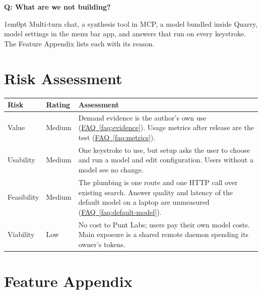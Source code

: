 \documentclass[11pt,letterpaper]{article}
\newcounter{faqnum}
\newenvironment{faqpair}[1]{%
  \needspace{4\baselineskip}%
  \vspace{0.5em}%
  \refstepcounter{faqnum}%
  \noindent\textbf{\color{SectionBlue}Q\thefaqnum: #1}\par\nopagebreak[4]%
  \vspace{0.2em}%
  \begin{adjustwidth}{1em}{0pt}%
  \setlength{\parindent}{0pt}%
}{%
  \end{adjustwidth}%
  \vspace{0.5em}%
}
\newcommand{\faqref}[1]{\hyperref[#1]{FAQ~\ref*{#1}}}
\begin{document}
\begin{faqpair}{What are we not building?}\label{faq:not-building}
  Multi-turn chat, a synthesis tool in MCP, a model bundled inside Quarry,
  model settings in the menu bar app, and answers that run on every keystroke.
  The Feature Appendix lists each with its reason.
\end{faqpair}


\newpage
\section*{Risk Assessment}

\renewcommand{\arraystretch}{1.6}
\begin{tabularx}{\textwidth}{@{} l l X @{}}
\toprule
\textbf{\color{SectionBlue}Risk} & \textbf{\color{SectionBlue}Rating} & \textbf{\color{SectionBlue}Assessment} \\
\midrule
Value       & \textcolor{RiskAmber}{Medium} & Demand evidence is the author's own use (\faqref{faq:evidence}). Usage metrics after release are the test (\faqref{faq:metrics}). \\
Usability   & \textcolor{RiskAmber}{Medium} & One keystroke to use, but setup asks the user to choose and run a model and edit configuration. Users without a model see no change. \\
Feasibility & \textcolor{RiskAmber}{Medium} & The plumbing is one route and one HTTP call over existing search. Answer quality and latency of the default model on a laptop are unmeasured (\faqref{faq:default-model}). \\
Viability   & \textcolor{RiskGreen}{Low}    & No cost to Punt Labs; users pay their own model costs. Main exposure is a shared remote daemon spending its owner's tokens. \\
\bottomrule
\end{tabularx}
\renewcommand{\arraystretch}{1.0}


\newpage
\section*{Feature Appendix}
\end{document}
